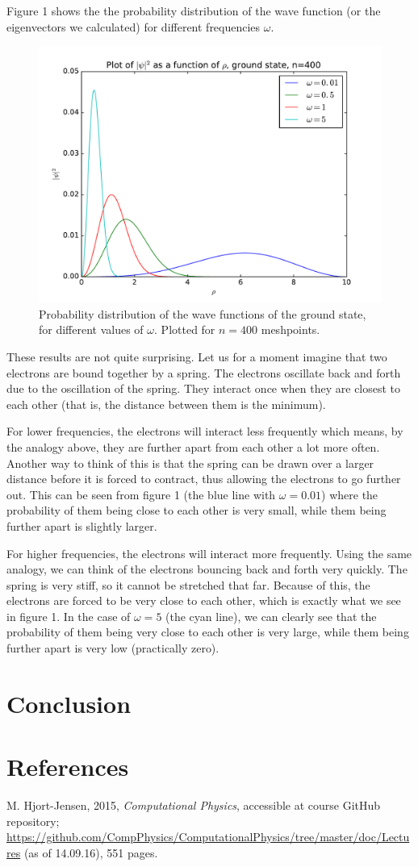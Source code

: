 \documentclass[12pt]{article}
\begin{document}
Figure 1 shows the the probability distribution of the wave function (or the eigenvectors we calculated) for different frequencies $\omega$.
\begin{figure}[hbtp]
\centering
\includegraphics[width=\linewidth]{Plots/Plot_groundstate_n400.pdf}
\caption{Probability distribution of the wave functions of the ground state, for different values of $\omega$. Plotted for $n=400$ meshpoints.}
\end{figure}
These results are not quite surprising. Let us for a moment imagine that two electrons are bound together by a spring. The electrons oscillate back and forth due to the oscillation of the spring. They interact once when they are closest to each other (that is, the distance between them is the minimum).

For lower frequencies, the electrons will interact less frequently which means, by the analogy above, they are further apart from each other a lot more often. Another way to think of this is that the spring can be drawn over a larger distance before it is forced to contract, thus allowing the electrons to go further out. This can be seen from figure 1 (the blue line with $\omega = 0.01$) where the probability of them being close to each other is very small, while them being further apart is slightly larger.

For higher frequencies, the electrons will interact more frequently. Using the same analogy, we can think of the electrons bouncing back and forth very quickly. The spring is very stiff, so it cannot be stretched that far. Because of this, the electrons are forced to be very close to each other, which is exactly what we see in figure 1. In the case of $\omega = 5$ (the cyan line), we can clearly see that the probability of them being very close to each other is very large, while them being further apart is very low (practically zero).
\section{Conclusion}

\section{References}
M. Hjort-Jensen, 2015, \textit{Computational Physics}, accessible at course GitHub repository; \url{https://github.com/CompPhysics/ComputationalPhysics/tree/master/doc/Lectures} (as of 14.09.16), 551 pages.
\end{document}

